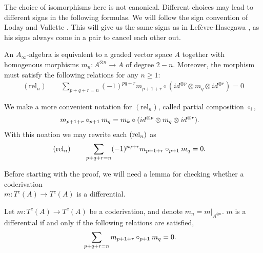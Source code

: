 \documentclass[../thesis.tex]{subfiles}
\begin{document}
        \begin{remark}
            The choice of isomorphisms here is not canonical. Different choices may lead to different signs in the following formulas. We will follow the sign convention of Loday and Vallette \cite{Loday12}. This will give us the same signs as in Lef\`evre-Hasegawa \cite{LefevreHasegawa03}, as his signs always come in a pair to cancel each other out.
        \end{remark}

        \begin{proposition}\label{prop: A-infinity def}
            An $A_\infty$-algebra is equivalent to a graded vector space $A$ together with homogenous morphisms $m_n: A^{\otimes n}\rightarrow A$ of degree $2-n$. Moreover, the morphism must satisfy the following relations for any $n\geq 1$:
            \begin{align*}
                (\text{rel}_n)\qquad \sum_{p+q+r = n}(-1)^{pq+r}m_{p+1+r}\circ (id^{\otimes p}\otimes m_q \otimes id^{\otimes r}) = 0
            \end{align*}
        \end{proposition}

        \begin{remark}
            We make a more convenient notation for $(\text{rel}_n)$, called partial composition $\circ_i$,
            \begin{align*}
                & m_{p+1+r} \circ_{p+1} m_q = m_k \circ (id^{\otimes p}\otimes m_q \otimes id^{\otimes r})\tt{.}
            \end{align*}
            With this noation we may rewrite each $(\tt{rel}_n)$ as
            \begin{align*}
                (\text{rel}_n)\qquad & \sum_{p+q+r = n} (-1)^{pq+r} m_{p+1+r} \circ_{p+1} m_q = 0\tt{.}
            \end{align*}
        \end{remark}

        Before starting with the proof, we will need a lemma for checking whether a coderivation \\ $m: T^c(A) \rightarrow T^c(A)$ is a differential.

        \begin{lemma}\label{lem: coderivation-is-diff?}
            Let $m: T^c(A) \rightarrow T^c(A)$ be a coderivation, and denote $m_n = m|_{A^{\otimes n}}$. $m$ is a differential if and only if the following relations are satisfied,
            \begin{align*}
                & \sum_{p+q+r = n}m_{p+1+r}\circ_{p+1}m_q = 0\tt{.}
            \end{align*}
        \end{lemma}
\end{document}
